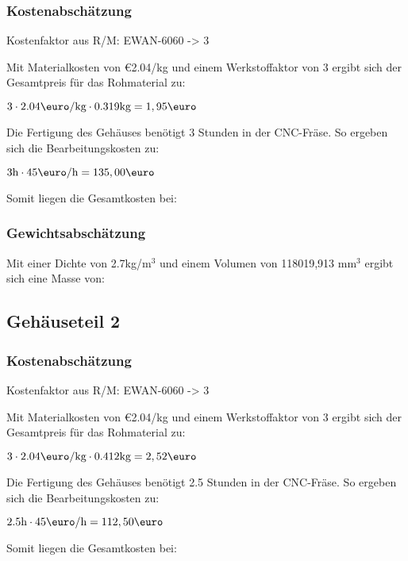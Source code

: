 \documentclass[10pt, a4paper]{article}
\begin{document}
\subsubsection{Kostenabschätzung}
\begin{center}
  Kostenfaktor aus R/M: EWAN-6060 -> 3
\end{center}
Mit Materialkosten von \euro2.04/kg und einem Werkstoffaktor von 3 ergibt sich der Gesamtpreis für das Rohmaterial zu: 
\begin{center}
    $3 \cdot 2.04\text{\euro/kg} \cdot 0.319\text{kg} = 1,95\text{\euro}$
\end{center}
Die Fertigung des Gehäuses benötigt 3 Stunden in der CNC-Fräse. So ergeben sich die Bearbeitungskosten zu:
\begin{center}
  $3\text{h} \cdot 45\text{\euro/h}= 135,00\text{\euro}$
\end{center}
Somit liegen die Gesamtkosten bei:
\begin{flushright}
\end{flushright}
\subsubsection{Gewichtsabschätzung}
Mit einer Dichte von 2.7kg/m$^3$ und einem Volumen von 118019,913 mm$^3$ ergibt sich eine Masse von:
\begin{flushright}
\end{flushright}


\newpage
\subsection{Gehäuseteil 2}
\begin{figure}[h]
  \centering
  \vspace{-10pt}
\end{figure}
\subsubsection{Kostenabschätzung}
\begin{center}
  Kostenfaktor aus R/M: EWAN-6060 -> 3
\end{center}
Mit Materialkosten von \euro2.04/kg und einem Werkstoffaktor von 3 ergibt sich der Gesamtpreis für das Rohmaterial zu: 
\begin{center}
    $3 \cdot 2.04\text{\euro/kg} \cdot 0.412\text{kg} = 2,52\text{\euro}$
\end{center}
Die Fertigung des Gehäuses benötigt 2.5 Stunden in der CNC-Fräse. So ergeben sich die Bearbeitungskosten zu:
\begin{center}
  $2.5\text{h} \cdot 45\text{\euro/h}= 112,50\text{\euro}$
\end{center}
Somit liegen die Gesamtkosten bei:
\begin{flushright}
\end{flushright}
\end{document}
